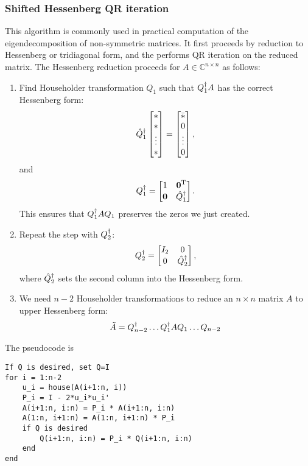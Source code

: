 \documentclass{article}
\begin{document}
\subsubsection{Shifted Hessenberg QR iteration}
This algorithm is commonly used in practical computation of the eigendecomposition of non-symmetric matrices. It first proceeds by reduction to Hessenberg or tridiagonal form, and the performs QR iteration on the reduced matrix. The Hessenberg reduction proceeds for $A\in\mathbb{C}^{n\times n}$ as follows:
\begin{enumerate}
    \item Find Householder transformation $Q_1$ such that $Q_1^{\dagger} A$ has the correct Hessenberg form:
    \begin{equation}
        \hat{Q}_1^{\dagger}
        \begin{bmatrix}
            \ast \\ \ast \\ \vdots \\ \ast
        \end{bmatrix}=
        \begin{bmatrix}
            \bar{\ast} \\ 0 \\ \vdots \\ 0
        \end{bmatrix},
    \end{equation}
    and 
    \begin{equation}
        Q_1^{\dagger}=\begin{bmatrix}{1}&{\bm{\mathrm{0}}^{\text{T}}}\\{\bm{\mathrm{0}}}&{\hat{Q}_1^{\dagger}}\end{bmatrix}.
    \end{equation}
    This ensures that $Q_1^{\dagger} AQ_1$ preserves the zeros we just created.
    \item Repeat the step with ${Q}_2^{\dagger}$:
    \begin{equation}
        Q_2^{\dagger}=\begin{bmatrix}{I_2}&{0}\\{0}&{\hat{Q}_2^{\dagger}}\end{bmatrix},
    \end{equation}
    where $\hat{Q}_2^{\dagger}$ sets the second column into the Hessenberg form.
    \item We need $n-2$ Householder transformations to reduce an $n\times n$ matrix $A$ to upper Hessenberg form:
    \begin{equation}
        \tilde{A}=Q_{n-2}^{\dagger}\dots Q_1^{\dagger} AQ_1\dots Q_{n-2}
    \end{equation}
\end{enumerate}
The pseudocode is
\begin{verbatim}
If Q is desired, set Q=I
for i = 1:n-2
    u_i = house(A(i+1:n, i))
    P_i = I - 2*u_i*u_i'
    A(i+1:n, i:n) = P_i * A(i+1:n, i:n)
    A(1:n, i+1:n) = A(1:n, i+1:n) * P_i
    if Q is desired
        Q(i+1:n, i:n) = P_i * Q(i+1:n, i:n)
    end
end
\end{verbatim}
\end{document}
